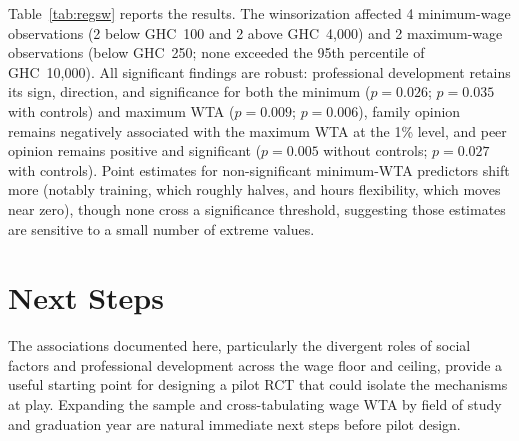 \documentclass[12pt]{article}
\begin{document}
Table~\ref{tab:regsw} reports the results. The winsorization affected 4 minimum-wage
observations (2 below GHC~100 and 2 above GHC~4,000) and 2 maximum-wage observations
(below GHC~250; none exceeded the 95th percentile of GHC~10,000). All significant
findings are robust: professional development retains its sign, direction, and
significance for both the minimum ($p = 0.026$; $p = 0.035$ with controls) and maximum
WTA ($p = 0.009$; $p = 0.006$), family opinion remains negatively associated with the
maximum WTA at the 1\% level, and peer opinion remains positive and significant
($p = 0.005$ without controls; $p = 0.027$ with controls). Point estimates for
non-significant minimum-WTA predictors shift more (notably training, which roughly
halves, and hours flexibility, which moves near zero), though none cross a significance
threshold, suggesting those estimates are sensitive to a small number of extreme values.



\section{Next Steps}

The associations documented here, particularly the divergent roles of social factors and
professional development across the wage floor and ceiling, provide a useful
starting point for designing a pilot RCT that could isolate the mechanisms at play.
Expanding the sample and cross-tabulating wage WTA by field of study and graduation
year are natural immediate next steps before pilot design.
\end{document}
